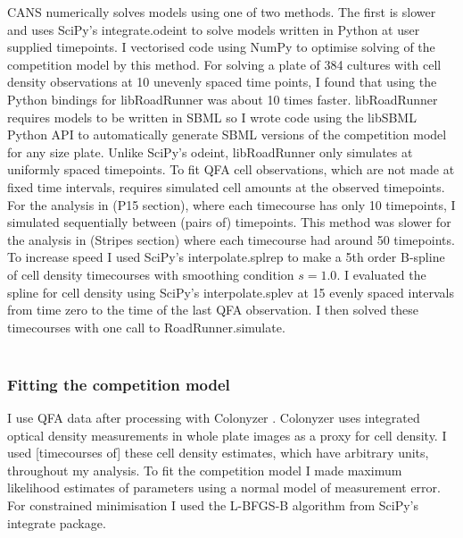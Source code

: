 CANS numerically solves models using one of two methods. The first is
slower and uses SciPy's integrate.odeint to solve models written in
Python at user supplied timepoints. I vectorised code using NumPy to
optimise solving of the competition model by this method. For solving
a plate of 384 cultures with cell density observations at 10 unevenly
spaced time points, I found that using the Python bindings for
libRoadRunner was about 10 times faster. libRoadRunner requires models
to be written in SBML so I wrote code using the libSBML Python API to
automatically generate SBML versions of the competition model for any
size plate.
Unlike SciPy's odeint, libRoadRunner only simulates at uniformly
spaced timepoints. To fit QFA cell observations, which are not made at
fixed time intervals, requires simulated cell amounts at the observed
timepoints. For the analysis in (P15 section), where each timecourse
has only 10 timepoints, I simulated sequentially between (pairs of)
timepoints. This method was slower for the analysis in (Stripes
section) where each timecourse had around 50 timepoints. To increase
speed I used SciPy's interpolate.splrep to make a 5th order B-spline
of cell density timecourses with smoothing condition \(s=1.0\). I
evaluated the spline for cell density using SciPy's interpolate.splev
at 15 evenly spaced intervals from time zero to the time of the last
QFA observation. I then solved these
timecourses with one call to RoadRunner.simulate.\\\\

\subsubsection{Fitting the competition model}

I use QFA data after processing with Colonyzer \citep{Lawless2010}.
Colonyzer uses integrated optical density measurements in whole plate
images as a proxy for cell density. I used [timecourses of] these cell
density estimates, which have arbitrary units, throughout my
analysis. To fit the competition model I made maximum likelihood
estimates of parameters using a normal model of measurement error.
For constrained minimisation I used the L-BFGS-B algorithm from
SciPy's integrate package.

